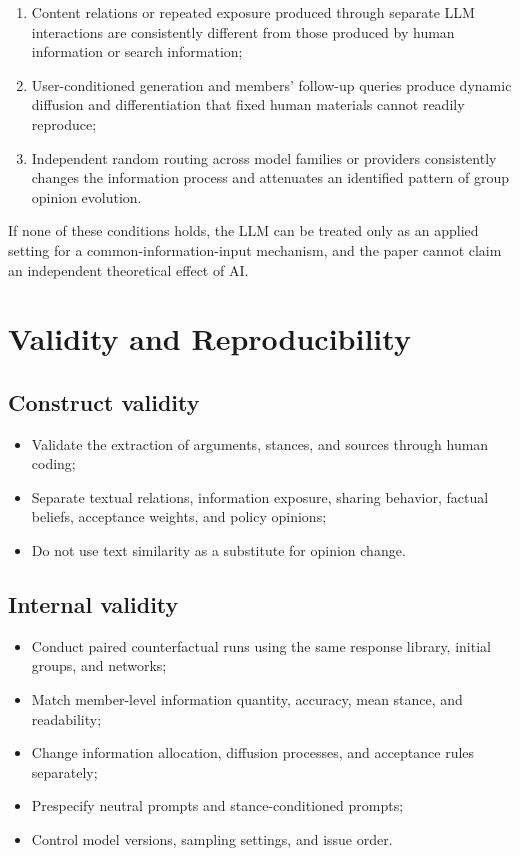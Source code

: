 \documentclass[11pt,a4paper]{article}
\begin{document}
\begin{enumerate}
\item Content relations or repeated exposure produced through separate LLM interactions are consistently different from those produced by human information or search information;
\item User-conditioned generation and members' follow-up queries produce dynamic diffusion and differentiation that fixed human materials cannot readily reproduce;
\item Independent random routing across model families or providers consistently changes the information process and attenuates an identified pattern of group opinion evolution.
\end{enumerate}

If none of these conditions holds, the LLM can be treated only as an applied setting for a common-information-input mechanism, and the paper cannot claim an independent theoretical effect of AI.

\section{Validity and Reproducibility}

\subsection{Construct validity}

\begin{itemize}
\item Validate the extraction of arguments, stances, and sources through human coding;
\item Separate textual relations, information exposure, sharing behavior, factual beliefs, acceptance weights, and policy opinions;
\item Do not use text similarity as a substitute for opinion change.
\end{itemize}

\subsection{Internal validity}

\begin{itemize}
\item Conduct paired counterfactual runs using the same response library, initial groups, and networks;
\item Match member-level information quantity, accuracy, mean stance, and readability;
\item Change information allocation, diffusion processes, and acceptance rules separately;
\item Prespecify neutral prompts and stance-conditioned prompts;
\item Control model versions, sampling settings, and issue order.
\end{itemize}
\end{document}
